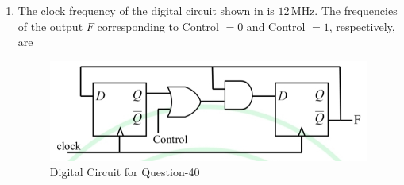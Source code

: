 \documentclass[journal,12pt,onecolumn]{IEEEtran}
\theoremstyle{remark}
\begin{document}
\begin{enumerate}
\item The clock frequency of the digital circuit shown in  is $12\,\text{MHz}$. The frequencies of the output $F$ corresponding to Control $=0$ and Control $=1$, respectively, are \par\hfill{}
\begin{figure}[H]
\centering
\includegraphics[width=0.5\columnwidth]{Figs/Q-40.jpg}
\caption{Digital Circuit for Question-40}
\label{40}
\end{figure}
\begin{enumerate}
\end{enumerate}



\end{enumerate}
\end{document}
